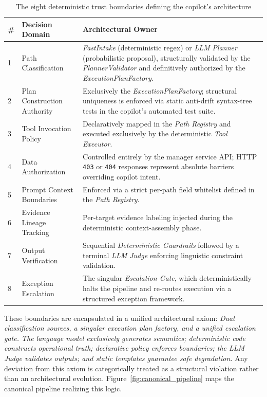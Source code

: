 \newpage
\begin{table}[H]
\centering
\scriptsize
\renewcommand{\arraystretch}{1.3}
\begin{tabular}{|p{0.6cm}|p{5.5cm}|p{8cm}|}
\hline
\rowcolor{lightgray}
\textbf{\#} & \textbf{Decision Domain} & \textbf{Architectural Owner} \\ \hline
1 & Path Classification & \textit{FastIntake} (deterministic regex) or \textit{LLM Planner} (probabilistic proposal), structurally validated by the \textit{PlannerValidator} and definitively authorized by the \textit{ExecutionPlanFactory}. \\ \hline
2 & Plan Construction Authority & Exclusively the \textit{ExecutionPlanFactory}; structural uniqueness is enforced via static anti-drift syntax-tree tests in the copilot's automated test suite. \\ \hline
3 & Tool Invocation Policy & Declaratively mapped in the \textit{Path Registry} and executed exclusively by the deterministic \textit{Tool Executor}. \\ \hline
4 & Data Authorization & Controlled entirely by the manager service API; HTTP \texttt{403} or \texttt{404} responses represent absolute barriers overriding copilot intent. \\ \hline
5 & Prompt Context Boundaries & Enforced via a strict per-path field whitelist defined in the \textit{Path Registry}. \\ \hline
6 & Evidence Lineage Tracking & Per-target evidence labeling injected during the deterministic context-assembly phase. \\ \hline
7 & Output Verification & Sequential \textit{Deterministic Guardrails} followed by a terminal \textit{LLM Judge} enforcing linguistic constraint validation. \\ \hline
8 & Exception Escalation & The singular \textit{Escalation Gate}, which deterministically halts the pipeline and re-routes execution via a structured exception framework. \\ \hline
\end{tabular}
\caption{The eight deterministic trust boundaries defining the copilot's architecture}
\label{tab:trust_boundaries}
\end{table}

These boundaries are encapsulated in a unified architectural axiom: \textit{Dual classification sources, a singular execution plan factory, and a unified escalation gate. The language model exclusively generates semantics; deterministic code constructs operational truth; declarative policy enforces boundaries; the LLM Judge validates outputs; and static templates guarantee safe degradation.} Any deviation from this axiom is categorically treated as a structural violation rather than an architectural evolution. Figure~\ref{fig:canonical_pipeline} maps the canonical pipeline realizing this logic.

